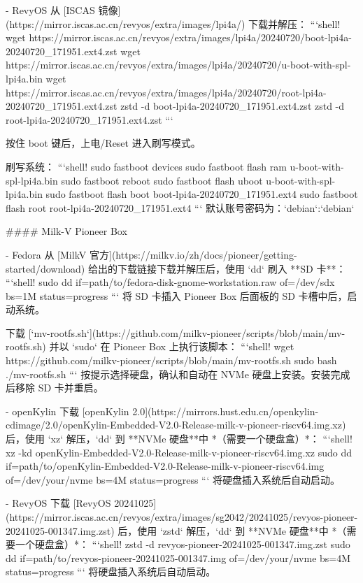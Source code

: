 \documentclass{article}
\begin{document}
\begin{markdown}
- RevyOS
从 [ISCAS 镜像](https://mirror.iscas.ac.cn/revyos/extra/images/lpi4a/) 下载并解压：
```shell!
wget https://mirror.iscas.ac.cn/revyos/extra/images/lpi4a/20240720/boot-lpi4a-20240720_171951.ext4.zst
wget https://mirror.iscas.ac.cn/revyos/extra/images/lpi4a/20240720/u-boot-with-spl-lpi4a.bin
wget https://mirror.iscas.ac.cn/revyos/extra/images/lpi4a/20240720/root-lpi4a-20240720_171951.ext4.zst
zstd -d boot-lpi4a-20240720_171951.ext4.zst
zstd -d root-lpi4a-20240720_171951.ext4.zst
```

按住 boot 键后，上电/Reset 进入刷写模式。

刷写系统：
```shell!
sudo fastboot devices
sudo fastboot flash ram u-boot-with-spl-lpi4a.bin 
sudo fastboot reboot
sudo fastboot flash uboot u-boot-with-spl-lpi4a.bin
sudo fastboot flash boot boot-lpi4a-20240720_171951.ext4
sudo fastboot flash root root-lpi4a-20240720_171951.ext4
```
默认账号密码为：`debian`:`debian`

#### Milk-V Pioneer Box

- Fedora
从 [MilkV 官方](https://milkv.io/zh/docs/pioneer/getting-started/download) 给出的下载链接下载并解压后，使用 `dd` 刷入 **SD 卡**：
```shell!
sudo dd if=path/to/fedora-disk-gnome-workstation.raw of=/dev/sdx bs=1M status=progress
```
将 SD 卡插入 Pioneer Box 后面板的 SD 卡槽中后，启动系统。

下载 [`mv-rootfs.sh`](https://github.com/milkv-pioneer/scripts/blob/main/mv-rootfs.sh) 并以 `sudo` 在 Pioneer Box 上执行该脚本：
```shell!
wget https://github.com/milkv-pioneer/scripts/blob/main/mv-rootfs.sh
sudo bash ./mv-rootfs.sh
```
按提示选择硬盘，确认和自动在 NVMe 硬盘上安装。安装完成后移除 SD 卡并重启。

- openKylin
下载 [openKylin 2.0](https://mirrors.hust.edu.cn/openkylin-cdimage/2.0/openKylin-Embedded-V2.0-Release-milk-v-pioneer-riscv64.img.xz) 后，使用 `xz` 解压，`dd` 到 **NVMe 硬盘**中 *（需要一个硬盘盒）*：
```shell!
xz -kd openKylin-Embedded-V2.0-Release-milk-v-pioneer-riscv64.img.xz
sudo dd if=path/to/openKylin-Embedded-V2.0-Release-milk-v-pioneer-riscv64.img of=/dev/your/nvme bs=4M status=progress
```
将硬盘插入系统后自动启动。

- RevyOS
下载 [RevyOS 20241025](https://mirror.iscas.ac.cn/revyos/extra/images/sg2042/20241025/revyos-pioneer-20241025-001347.img.zst) 后，使用 `zstd` 解压，`dd` 到 **NVMe 硬盘**中 *（需要一个硬盘盒）*：
```shell!
zstd -d revyos-pioneer-20241025-001347.img.zst
sudo dd if=path/to/revyos-pioneer-20241025-001347.img of=/dev/your/nvme bs=4M status=progress
```
将硬盘插入系统后自动启动。


\end{markdown}
\end{document}
